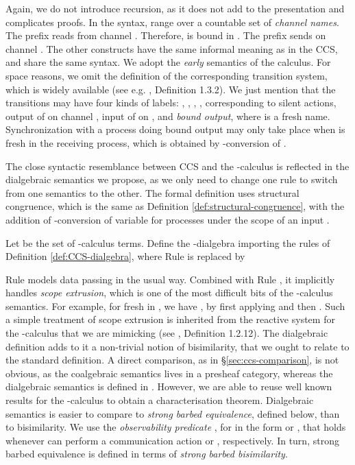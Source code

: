 \documentclass[orivec]{llncs}
\newcommand{\defend}{}
\renewenvironment{definition}{\begin{defn}}{\defend\end{defn}}
\begin{document}
Again, we do not introduce recursion, as it does not add to the presentation and complicates proofs.  In the syntax,  range over a countable set of \emph{channel names}.
The prefix  reads  from channel . Therefore,  is bound in . The prefix  sends  on channel . The other constructs have the same informal meaning as in the CCS, and share the same syntax.  We adopt the \emph{early} semantics of the calculus. For space reasons, we omit the definition of the corresponding transition system, which is widely available (see e.g. \cite{San01}, Definition 1.3.2). We just mention that the transitions may have four kinds of labels: , , , , corresponding to silent actions, output of  on channel , input of  on , and \emph{bound output}, where  is a fresh name. Synchronization with a process doing bound output may only take place when  is fresh in the receiving process, which is obtained by -conversion of .

The close syntactic resemblance between CCS and the -calculus is reflected in the dialgebraic semantics we propose, as we only need to change one rule to switch from one semantics to the other. The formal definition uses structural congruence, which is the same as Definition \ref{def:structural-congruence},  with the addition of -conversion of variable  for processes under the scope of an input .

\begin{definition}
Let  be the set of -calculus terms. Define the -dialgebra  importing the rules of Definition \ref{def:CCS-dialgebra}, where Rule  is replaced by 

\end{definition}
Rule  models data passing in the usual way. Combined with Rule , it implicitly handles \emph{scope extrusion}, which is one of the most difficult bits of the -calculus semantics. For example, for  fresh in , we have , by first applying  and then . Such a simple treatment of scope extrusion is inherited from the reactive system for the -calculus that we are mimicking (see \cite{San01}, Definition 1.2.12). The dialgebraic definition adds to it a non-trivial notion of bisimilarity, that we ought to relate to the standard definition. A direct comparison, as in \S \ref{sec:ccs-comparison}, is not obvious, as the coalgebraic semantics lives in a presheaf category, whereas the dialgebraic semantics is defined in . However, we are able to reuse well known results for the -calculus to obtain a characterisation theorem. Dialgebraic semantics is easier to compare to \emph{strong barbed equivalence}, defined below, than to bisimilarity. We use the \emph{observability predicate} , for  in the form  or , that holds whenever  can perform a communication action  or , respectively. In turn, strong barbed equivalence is defined in terms of \emph{strong barbed bisimilarity}.
\end{document}
